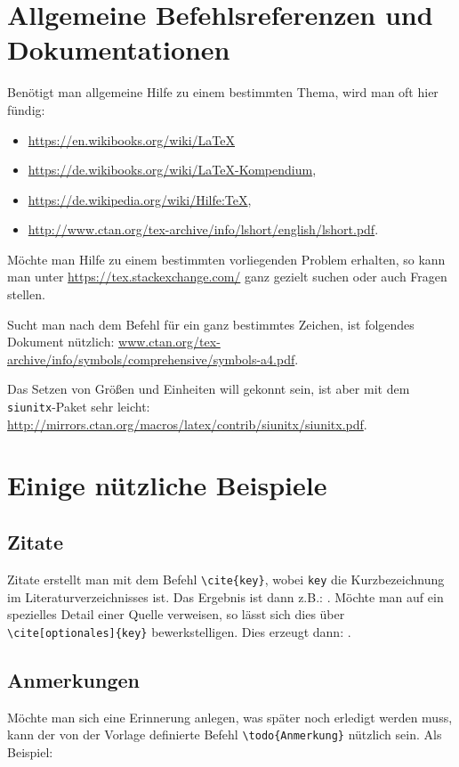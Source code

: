 \section{Allgemeine Befehlsreferenzen und Dokumentationen}
Benötigt man allgemeine Hilfe zu einem bestimmten Thema, wird man oft hier fündig:

\begin{itemize}
 \item \url{https://en.wikibooks.org/wiki/LaTeX}
 \item \url{https://de.wikibooks.org/wiki/LaTeX-Kompendium},
 \item \url{https://de.wikipedia.org/wiki/Hilfe:TeX},
 \item \url{http://www.ctan.org/tex-archive/info/lshort/english/lshort.pdf}.
\end{itemize}

Möchte man Hilfe zu einem bestimmten vorliegenden Problem erhalten, so kann man unter \url{https://tex.stackexchange.com/} ganz gezielt suchen oder auch Fragen stellen.

Sucht man nach dem Befehl für ein ganz bestimmtes Zeichen, ist folgendes Dokument nützlich: \url{www.ctan.org/tex-archive/info/symbols/comprehensive/symbols-a4.pdf}.

Das Setzen von Größen und Einheiten will gekonnt sein, ist aber mit dem \verb|siunitx|-Paket sehr leicht: \url{http://mirrors.ctan.org/macros/latex/contrib/siunitx/siunitx.pdf}.

\section{Einige nützliche Beispiele}
\subsection{Zitate}
Zitate erstellt man mit dem Befehl \verb|\cite{key}|, wobei \verb|key| die Kurzbezeichnung im Literaturverzeichnisses ist. Das Ergebnis ist dann z.B.: \cite{EKS07}. Möchte man auf ein spezielles Detail einer Quelle verweisen, so lässt sich dies über \verb|\cite[optionales]{key}| bewerkstelligen. Dies erzeugt dann: \cite[S. 42]{EKS07}.

\subsection{Anmerkungen}
Möchte man sich eine Erinnerung anlegen, was später noch erledigt werden muss, kann der von der Vorlage definierte Befehl \verb|\todo{Anmerkung}| nützlich sein. Als Beispiel:

